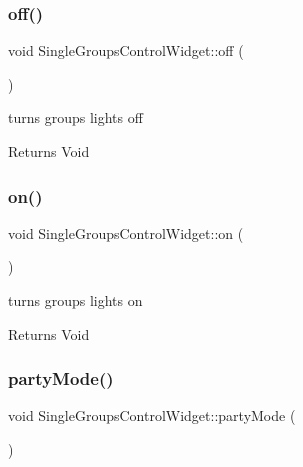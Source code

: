 \subsubsection{\texorpdfstring{off()}{off()}}
{\footnotesize\ttfamily void Single\+Groups\+Control\+Widget\+::off (\begin{DoxyParamCaption}{ }\end{DoxyParamCaption})\hspace{0.3cm}{\ttfamily [private]}}



turns group\textquotesingle{}s lights off 

\begin{DoxyReturn}{Returns}
Void 
\end{DoxyReturn}
\mbox{\label{class_single_groups_control_widget_ae1b39e4fd180f949cc6161a5837b659f}} 
\subsubsection{\texorpdfstring{on()}{on()}}
{\footnotesize\ttfamily void Single\+Groups\+Control\+Widget\+::on (\begin{DoxyParamCaption}{ }\end{DoxyParamCaption})\hspace{0.3cm}{\ttfamily [private]}}



turns group\textquotesingle{}s lights on 

\begin{DoxyReturn}{Returns}
Void 
\end{DoxyReturn}
\mbox{\label{class_single_groups_control_widget_a558dac00b479b6640de62b4812802250}} 
\subsubsection{\texorpdfstring{party\+Mode()}{partyMode()}}
{\footnotesize\ttfamily void Single\+Groups\+Control\+Widget\+::party\+Mode (\begin{DoxyParamCaption}{ }\end{DoxyParamCaption})\hspace{0.3cm}{\ttfamily [private]}}



